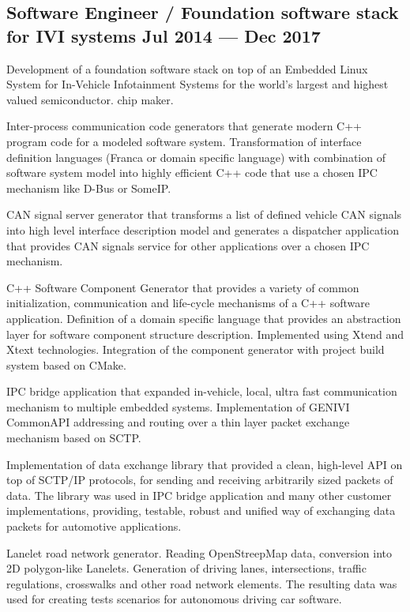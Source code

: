 \documentclass[letter,10pt]{article}
\begin{document}
\subsection{{Software Engineer / Foundation software stack for IVI systems \hfill Jul 2014 --- Dec 2017}}
\begin{zitemize}
\item Development of a foundation software stack on top of an Embedded Linux System for In-Vehicle Infotainment Systems for the world's largest and highest valued semiconductor.
chip maker.
\item Inter-process communication code generators that generate modern C++ program code for a modeled software system. Transformation of interface definition languages (Franca or domain specific language) with combination of software system model into highly efficient C++ code that use a chosen IPC mechanism like D-Bus or SomeIP.
\item CAN signal server generator that transforms a list of defined vehicle CAN signals into high level interface description model and generates a dispatcher application that provides CAN signals service for other applications over a chosen IPC mechanism.
\item C++ Software Component Generator that provides a variety of common initialization, communication and life-cycle mechanisms of a C++ software application. Definition of a domain specific language that provides an abstraction layer for software component structure description. Implemented using Xtend and Xtext technologies. Integration of the component generator with project build system based on CMake.
\item IPC bridge application that expanded in-vehicle, local, ultra fast communication mechanism to multiple embedded systems. Implementation of GENIVI CommonAPI addressing and routing over a thin layer packet exchange mechanism based on SCTP.
\item Implementation of data exchange library that provided a clean, high-level API on top of SCTP/IP protocols, for sending and receiving arbitrarily sized packets of data. The library was used in IPC bridge application and many other customer implementations, providing, testable, robust and unified way of exchanging data packets for automotive applications.
\item Lanelet road network generator. Reading OpenStreepMap data, conversion into 2D polygon-like Lanelets. Generation of driving lanes, intersections, traffic regulations, crosswalks and other road network elements. The resulting data was used for creating tests scenarios for autonomous driving car software.
\end{zitemize}
\end{document}
